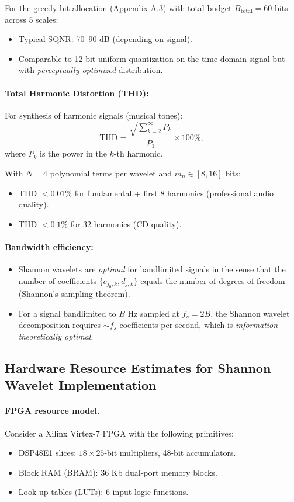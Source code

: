 For the greedy bit allocation (Appendix A.3) with total budget $B_{\text{total}} = 60$ bits across 5 scales:
\begin{itemize}
\item Typical SQNR: 70–90 dB (depending on signal).
\item Comparable to 12-bit uniform quantization on the time-domain signal but with \emph{perceptually optimized} distribution.
\end{itemize}

\paragraph{Total Harmonic Distortion (THD):}
For synthesis of harmonic signals (musical tones):
\[
\text{THD} = \frac{\sqrt{\sum_{k=2}^{\infty} P_k}}{P_1} \times 100\%,
\]
where $P_k$ is the power in the $k$-th harmonic.

With $N=4$ polynomial terms per wavelet and $m_n \in [8, 16]$ bits:
\begin{itemize}
\item THD $< 0.01\%$ for fundamental + first 8 harmonics (professional audio quality).
\item THD $< 0.1\%$ for 32 harmonics (CD quality).
\end{itemize}

\paragraph{Bandwidth efficiency:}
\begin{itemize}
\item Shannon wavelets are \emph{optimal} for bandlimited signals in the sense that the number of coefficients $\{c_{j_0,k}, d_{j,k}\}$ equals the number of degrees of freedom (Shannon's sampling theorem).
\item For a signal bandlimited to $B$ Hz sampled at $f_s = 2B$, the Shannon wavelet decomposition requires $\sim f_s$ coefficients per second, which is \emph{information-theoretically optimal}.
\end{itemize}

\subsection{Hardware Resource Estimates for Shannon Wavelet Implementation}

\paragraph{FPGA resource model.} Consider a Xilinx Virtex-7 FPGA with the following primitives:
\begin{itemize}
\item DSP48E1 slices: $18 \times 25$-bit multipliers, 48-bit accumulators.
\item Block RAM (BRAM): 36 Kb dual-port memory blocks.
\item Look-up tables (LUTs): 6-input logic functions.
\end{itemize}

